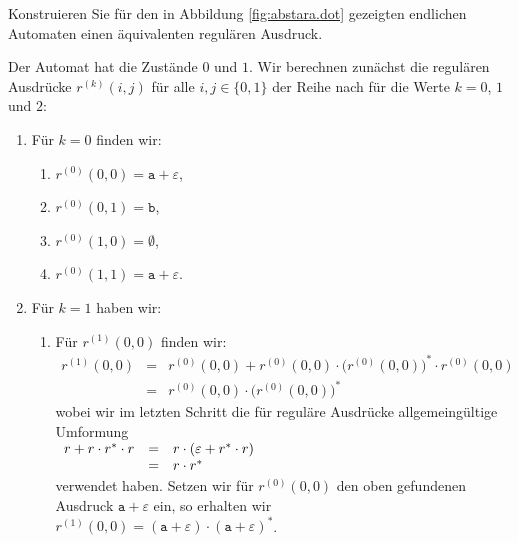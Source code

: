 \exercise
Konstruieren Sie f\"ur den in Abbildung \ref{fig:abstara.dot} gezeigten endlichen Automaten einen
\"aquivalenten regul\"aren Ausdruck.  


\solution
Der Automat hat die Zust\"ande $0$ und $1$.  Wir berechnen zun\"achst die regul\"aren Ausdr\"ucke
$r^{(k)}(i,j)$ f\"ur alle $i,j\in\{0,1\}$ der Reihe nach f\"ur die Werte $k =0$, $1$ und $2$:
\begin{enumerate}
\item F\"ur $k = 0$ finden wir:
      \begin{enumerate}
      \item $r^{(0)}(0, 0) = \texttt{a} + \varepsilon$,
      \item $r^{(0)}(0, 1) = \texttt{b}$,
      \item $r^{(0)}(1, 0) = \emptyset$,
      \item $r^{(0)}(1, 1) = \texttt{a} + \varepsilon$.
      \end{enumerate}
\item F\"ur $k=1$ haben wir:
      \begin{enumerate}
      \item F\"ur $r^{(1)}(0, 0)$ finden wir:
            \begin{eqnarray*}
                  r^{(1)}(0, 0) 
            & = & r^{(0)}(0, 0) + 
                  r^{(0)}(0, 0) \cdot \bigl(r^{(0)}(0, 0)\bigr)^* \cdot r^{(0)}(0, 0) \\
            & = & r^{(0)}(0, 0) \cdot \bigl(r^{(0)}(0, 0)\bigr)^*
            \end{eqnarray*}
             wobei wir im letzten Schritt die f\"ur regul\"are Ausdr\"ucke allgemeing\"ultige Umformung
             \\[0.2cm]
             \hspace*{1.3cm}
             $
             \begin{array}[t]{lcl}
               r + r \cdot r^* \cdot r & = & r \cdot (\varepsilon + r^* \cdot r) \\
                                       & = & r \cdot r^*
             \end{array}
             $
             \\[0.2cm]
             verwendet haben.
             Setzen wir f\"ur $r^{(0)}(0, 0)$ den oben gefundenen Ausdruck $\texttt{a} + \varepsilon$ ein, 
             so erhalten wir 
             \\[0.2cm]
             \hspace*{1.3cm}
             $r^{(1)}(0, 0) = (\texttt{a} + \varepsilon)\cdot (\texttt{a} + \varepsilon)^*$.

\end{enumerate}
\end{enumerate}

